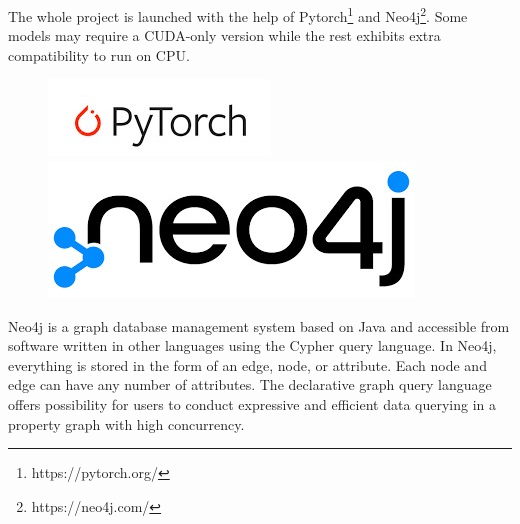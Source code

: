 \documentclass[11pt]{article}
\begin{document}
The whole project is launched with the help of Pytorch\footnote{https://pytorch.org/} and Neo4j\footnote{https://neo4j.com/}. Some models may require a CUDA-only version while the rest exhibits extra compatibility to run on CPU.
\begin{figure}[H]
	\centering
	\parbox{0.25\linewidth}{
		\includegraphics[width=\linewidth]{torch.jpg}
	}\quad
	\parbox{0.2\linewidth}{
		\includegraphics[width=\linewidth]{neo4j.jpg}
	}
\end{figure}
Neo4j is a graph database management system based on Java and accessible from software written in other languages using the Cypher query language. In Neo4j, everything is stored in the form of an edge, node, or attribute. Each node and edge can have any number of attributes. The declarative graph query language offers possibility for users to conduct expressive and efficient data querying in a property graph with high concurrency.
\end{document}
